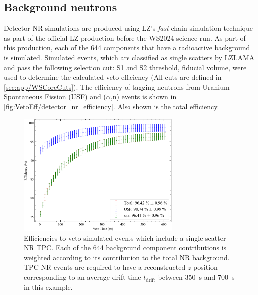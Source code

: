 \subsection{Background neutrons}\label{sec:VetoEff/BackgroundNeutrons}
Detector NR simulations are produced using LZ's \textit{fast} chain simulation technique as part of the official LZ production before the WS2024 science run.
As part of this production, each of the 644 components that have a radioactive background is simulated.
Simulated events, which are classified as single scatters by LZLAMA and pass the following selection cut: S1 and S2 threshold, fiducial volume, were used to determine the calculated veto efficiency (All cuts are defined in \autoref{sec:app/WSCoreCuts}).
The efficiency of tagging neutrons from Uranium Spontaneous Fission (USF) and ($\alpha$,n) events is shown in \autoref{fig:VetoEff/detector_nr_efficiency}. Also shown is the total efficiency.


\begin{figure}[!ht]
	\centering
	\includegraphics[width=0.7\textwidth]{figures/VetoEfficiency/det_nr_efficiency.png}
	\caption[Efficiencies to veto simulated events which include a single scatter NR TPC.]{Efficiencies to veto simulated events which include a single scatter NR TPC. Each of the 644 background component contributions is weighted according to its contribution to the total NR background. TPC NR events are required to have a reconstructed $z$-position corresponding to an average drift time $t_\text{drift}$ between 350~\textmu s and 700~\textmu s in this example.}
	\label{fig:VetoEff/detector_nr_efficiency}
\end{figure}

